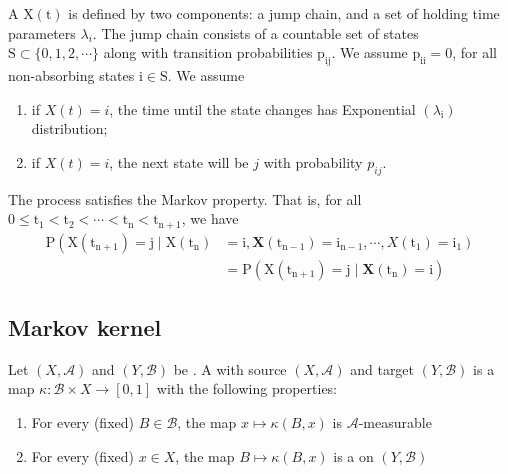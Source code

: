 A  $\mathrm{X}(\mathrm{t})$ is defined by two components: a jump chain, and a set of holding time parameters $\lambda_i$.
The jump chain consists of a countable set of states $\mathrm{S} \subset\{0,1,2, \cdots\}$ along with transition probabilities $\mathrm{p}_{\mathrm{ij}}$.
We assume $\mathrm{p}_{\mathrm{ii}}=0$, for all non-absorbing states $\mathrm{i} \in \mathrm{S}$.
We assume
\begin{enumerate}
\item if $X(t)=i$, the time until the state changes has Exponential $\left(\lambda_{\mathrm{i}}\right)$ distribution;
\item if $X(t)=i$, the next state will be $j$ with probability $p_{i j}$.
\end{enumerate}

The process satisfies the Markov property.
That is, for all $0 \leq \mathrm{t}_1<\mathrm{t}_2<\cdots<\mathrm{t}_{\mathrm{n}}<\mathrm{t}_{\mathrm{n}+1}$, we have
$$
\begin{aligned}
\mathrm{P}\left(\mathrm{X}\left(\mathrm{t}_{\mathrm{n}+1}\right)=\mathrm{j} \mid \mathrm{X}\left(\mathrm{t}_{\mathrm{n}}\right)\right. & \left.=\mathrm{i}, \mathbf{X}\left(\mathrm{t}_{\mathrm{n}-1}\right)=\mathrm{i}_{\mathrm{n}-1}, \cdots, X\left(\mathrm{t}_1\right)=\mathrm{i}_1\right) \\
& =\mathrm{P}\left(\mathrm{X}\left(\mathrm{t}_{\mathrm{n}+1}\right)=\mathrm{j} \mid \mathbf{X}\left(\mathrm{t}_{\mathrm{n}}\right)=\mathrm{i}\right)
\end{aligned}
$$


\subsection{Markov kernel}
\label{sec:markov-kernel}


Let $(X, \mathcal{A})$ and $(Y, \mathcal{B})$ be .
A  with source $(X, \mathcal{A})$ and target $(Y, \mathcal{B})$ is a map $\kappa: \mathcal{B} \times X \rightarrow[0,1]$ with the following properties:
\begin{enumerate}
\item For every (fixed) $B \in \mathcal{B}$, the map $x \mapsto \kappa(B, x)$ is $\mathcal{A}$-measurable
\item For every (fixed) $x \in X$, the map $B \mapsto \kappa(B, x)$ is a  on $(Y, \mathcal{B})$
\end{enumerate}

